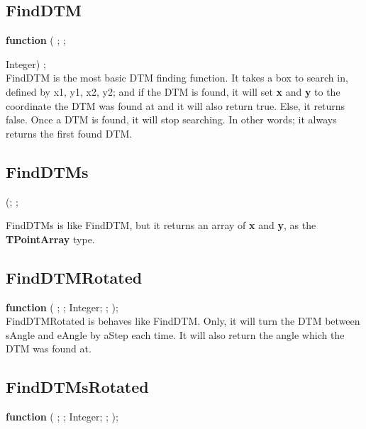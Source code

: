 \documentclass[a4paper]{report}
\begin{document}
\subsection{FindDTM}

\textbf{function} {\color{blue}{FindDTM}}({\color{typeRed}{DTM: }}
{\color{typeGreen}{Integer}}; {\color{typeRed}{out x, y: }}
{\color{typeGreen}{Integer}}; {\color{typeRed}{x1, y1, x2, y2: }}{\color{typeGreen}
{Integer}) {\color{typeGreen}{: Boolean}}; \\ 

FindDTM is the most basic DTM finding function. It takes a box to search in,
defined by x1, y1, x2, y2; and if the DTM is found, it will set \textbf{x} and 
\textbf{y} to the coordinate the DTM was found at and it will also return true. 
Else, it returns false. Once a DTM is found, it will stop searching. In other words; it always returns
the first found DTM.

\subsection{FindDTMs}

\pfunc {}(; 
;  

FindDTMs is like FindDTM, but it returns an array of \textbf{x} and \textbf{y}, as the
\textbf{TPointArray} type.

\subsection{FindDTMRotated}
\textbf{function} {\color{blue}{FindDTMRotated}}({\color{typeRed}{DTM: }}
{\color{typeGreen}{Integer}}; {\color{typeRed}{out x, y: }}
{\color{typeGreen}{Integer}}; {\color{typeRed}{x1, y1, x2, y2: }}{\color{typeGreen}
{Integer}}; {\color{typeRed}{sAngle, eAngle, aStep: }}{\color{typeGreen}{Extended}}; 
{\color{typeRed}{out aFound: }}{\color{typeGreen}{Extended}}){\color{typeGreen}{: Boolean}}; \\

FindDTMRotated is behaves like FindDTM. Only, it will turn the DTM between 
sAngle and eAngle by aStep each time. It will also return the angle which the DTM was found
at.

\subsection{FindDTMsRotated}
\textbf{function} {\color{blue}{FindDTMsRotated}}({\color{typeRed}{DTM: }}
{\color{typeGreen}{Integer}}; {\color{typeRed}{out Points: }}
{\color{typeGreen}{TPointArray}}; {\color{typeRed}{x1, y1, x2, y2: }}{\color{typeGreen}
{Integer}}; {\color{typeRed}{sAngle, eAngle, aStep: }}{\color{typeGreen}{Extended}}; 
{\color{typeRed}{out aFound: }}{\color{typeGreen}{T2DExtendedArray}}){\color{typeGreen}{: Boolean}}; \\

}
\end{document}
